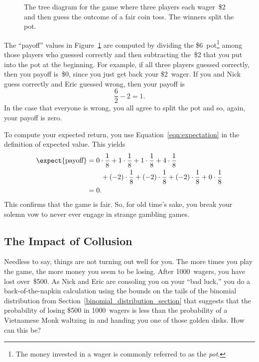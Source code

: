 \begin{figure}


\caption{The tree diagram for the game where three players each
  wager~\$2 and then guess the outcome of a fair coin toss.  The
  winners split the pot.}

\label{fig:17E1}

\end{figure}

The ``payoff'' values in Figure~\ref{fig:17E1} are computed by
dividing the \$6~pot\footnote{The money invested in a wager is
  commonly referred to as the \emph{pot}.} among those players who
guessed correctly and then subtracting the~\$2 that you put into the
pot at the beginning.  For example, if all three players guessed
correctly, then you payoff is~\$0, since you just get back your
\$2~wager.  If you and Nick guess correctly and Eric guessed wrong,
then your payoff is
\begin{equation*}
    \frac{6}{2} - 2 = 1.
\end{equation*}
In the case that everyone is wrong, you all agree to split the pot
and so, again, your payoff is zero.

To compute your expected return, you use
Equation~\ref{eqn:expectation} in the definition of expected value.
This yields
\begin{align*}
\expect{\text{payoff}}
    &= 0 \cdot \frac{1}{8} + 1 \cdot \frac{1}{8} + 1 \cdot \frac{1}{8}
        + 4 \cdot \frac{1}{8} \\
        & \qquad {}+ (-2) \cdot \frac{1}{8} + (-2) \cdot \frac{1}{8}
        + (-2) \cdot \frac{1}{8}
        + 0 \cdot \frac{1}{8} \\
    &= 0.
\end{align*}
This confirms that the game is fair.  So, for old time's sake, you
break your solemn vow to never ever engage in strange gambling games.

\subsection{The Impact of Collusion}

Needless to say, things are not turning out well for you.  The more
times you play the game, the more money you seem to be losing.  After
1000~wagers, you have lost over~\$500.  As Nick and Eric are consoling
you on your ``bad luck,'' you do a back-of-the-napkin calculation
using the bounds on the tails of the binomial distribution from
Section~\ref{binomial_distribution_section} that suggests that the
probability of losing \$500 in 1000~wagers is less than the
probability of a Vietnamese Monk waltzing in and handing you one of
those golden disks.  How can this be?

